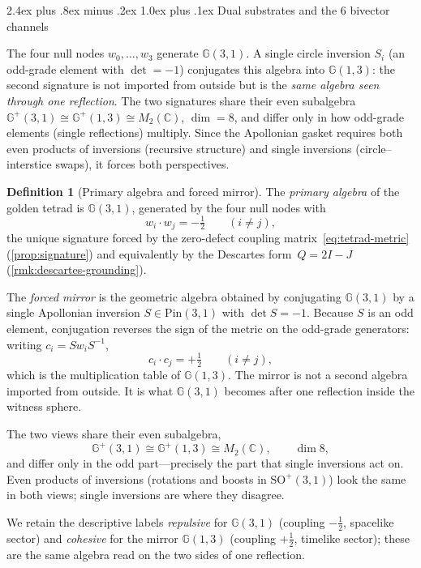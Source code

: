 \documentclass[11pt,a4paper]{article}
\makeatletter
\theoremstyle{plain}
\theoremstyle{definition}
\newtheorem{definition}[theorem]{Definition}
\theoremstyle{remark}
\numberwithin{equation}{section}
\newcommand{\Cl}{\mathbb{G}}
\renewcommand{\subsection}{%
  \@startsection{subsection}{2}{0pt}%
    {2.4ex plus .8ex minus .2ex}%
    {1.0ex plus .1ex}%
    {\normalfont\Large\bfseries\color{headingAccent}}%
}
\makeatother
\begin{document}
\subsection{Dual substrates and the 6 bivector channels}
\label{subsec:dual-substrates}

The four null nodes \(w_0,\ldots,w_3\) generate \(\Cl(3,1)\).  A single
circle inversion \(S_i\) (an odd-grade element with \(\det=-1\))
conjugates this algebra into \(\Cl(1,3)\): the second signature is not
imported from outside but is the \emph{same algebra seen through one
reflection}.  The two signatures share their even subalgebra
\(\Cl^+(3,1)\cong\Cl^+(1,3)\cong M_2(\mathbb{C})\), \(\dim=8\), and
differ only in how odd-grade elements (single reflections) multiply.
Since the Apollonian gasket requires both even products of inversions
(recursive structure) and single inversions (circle--interstice swaps),
it forces both perspectives.

\begin{definition}[Primary algebra and forced mirror]
\label{def:dual-substrates}
The \emph{primary algebra} of the golden tetrad is \(\Cl(3,1)\),
generated by the four null nodes with
\[
  w_i\cdot w_j=-\tfrac12 \qquad (i\ne j),
\]
the unique signature forced by the zero-defect coupling
matrix~\eqref{eq:tetrad-metric} (\cref{prop:signature}) and equivalently
by the Descartes form~\(Q=2I-J\) (\cref{rmk:descartes-grounding}).

The \emph{forced mirror} is the geometric algebra obtained by
conjugating \(\Cl(3,1)\) by a single Apollonian inversion
\(S\in\mathrm{Pin}(3,1)\) with \(\det S=-1\).  Because \(S\) is an odd
element, conjugation reverses the sign of the metric on the odd-grade
generators: writing \(c_i = S w_i S^{-1}\),
\[
  c_i\cdot c_j=+\tfrac12 \qquad (i\ne j),
\]
which is the multiplication table of \(\Cl(1,3)\).  The mirror is not a
second algebra imported from outside.  It is what \(\Cl(3,1)\) becomes
after one reflection inside the witness sphere.

The two views share their even subalgebra,
\[
  \Cl^+(3,1)\cong\Cl^+(1,3)\cong M_2(\mathbb{C}), \qquad \dim 8,
\]
and differ only in the odd part---precisely the part that single
inversions act on.  Even products of inversions (rotations and boosts in
\(\mathrm{SO}^+(3,1)\)) look the same in both views; single inversions
are where they disagree.

We retain the descriptive labels \emph{repulsive} for \(\Cl(3,1)\)
(coupling \(-\tfrac12\), spacelike sector) and \emph{cohesive} for the
mirror \(\Cl(1,3)\) (coupling \(+\tfrac12\), timelike sector); these are
the same algebra read on the two sides of one reflection.
\end{definition}
\end{document}
